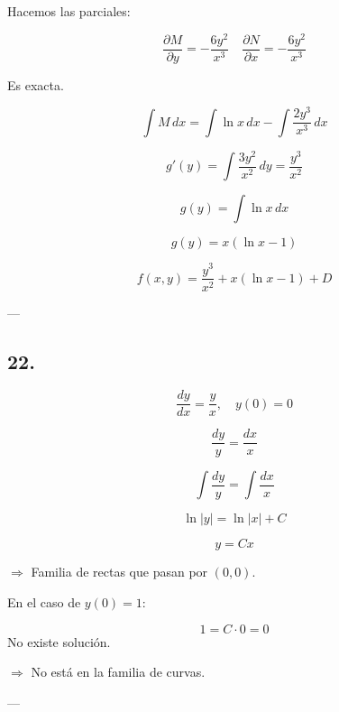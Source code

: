 \documentclass[a4paper,12pt]{article}
\begin{document}
Hacemos las parciales:

\[
\frac{\partial M}{\partial y} = -\frac{6y^2}{x^3} 
\quad 
\frac{\partial N}{\partial x} = -\frac{6y^2}{x^3}
\]

Es exacta.

\[
\int M\, dx = \int \ln x\, dx - \int \frac{2y^3}{x^3}\, dx
\]

\[
g'(y) = \int \frac{3y^2}{x^2}\, dy = \frac{y^3}{x^2}
\]

\[
g(y) = \int \ln x\, dx
\]

\[
g(y) = x (\ln x - 1)
\]

\[
f(x,y) = \frac{y^3}{x^2} + x(\ln x - 1) + D
\]

---

\subsection*{22.}
\[
\frac{dy}{dx} = \frac{y}{x}, \quad y(0) = 0
\]

\[
\frac{dy}{y} = \frac{dx}{x}
\]

\[
\int \frac{dy}{y} = \int \frac{dx}{x}
\]

\[
\ln |y| = \ln |x| + C
\]

\[
y = Cx
\]

$\Rightarrow$ Familia de rectas que pasan por $(0,0)$.

En el caso de $y(0) = 1$:

\[
1 = C \cdot 0 = 0
\]
No existe solución.

$\Rightarrow$ No está en la familia de curvas.

---
\end{document}
